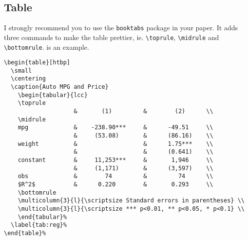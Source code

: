 \documentclass[en]{elegantpaper}
\begin{document}
\subsection{Table}
I strongly recommend you to use the \lstinline{booktabs} package in your paper. It adds three commands to make the table prettier, ie. \lstinline{\toprule}, \lstinline{\midrule} and \lstinline{\bottomrule}.  is an example.

\begin{lstlisting}
\begin{table}[htbp]
  \small
  \centering
  \caption{Auto MPG and Price}
    \begin{tabular}{lcc}
    \toprule
                    &       (1)         &        (2)      \\
    \midrule
    mpg             &    -238.90***     &      -49.51     \\
                    &     (53.08)       &      (86.16)    \\
    weight          &                   &      1.75***    \\
                    &                   &      (0.641)    \\
    constant        &     11,253***     &       1,946     \\
                    &     (1,171)       &      (3,597)    \\
    obs             &        74         &         74      \\
    $R^2$           &      0.220        &       0.293     \\
    \bottomrule
    \multicolumn{3}{l}{\scriptsize Standard errors in parentheses} \\
    \multicolumn{3}{l}{\scriptsize *** p<0.01, ** p<0.05, * p<0.1} \\
    \end{tabular}%
  \label{tab:reg}%
\end{table}%
\end{lstlisting}
\end{document}
